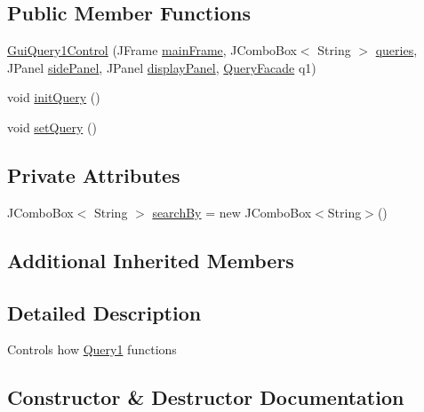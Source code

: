 \subsection*{Public Member Functions}
\begin{DoxyCompactItemize}
\item 
\hyperlink{classGuiQuery1Control_ac6989198b8ec672bd3d5329c98f0fe0a}{Gui\+Query1\+Control} (J\+Frame \hyperlink{classGUIQuery_aba988b5bec899d53480a472de7b87dfa}{main\+Frame}, J\+Combo\+Box$<$ String $>$ \hyperlink{classGUIQuery_a0db8bd960b4512cadf9aa40642934680}{queries}, J\+Panel \hyperlink{classGUIQuery_a70e233b1f14874166b7707edebe825d2}{side\+Panel}, J\+Panel \hyperlink{classGUIQuery_a8b4dbf257e0859c597591f072349b75c}{display\+Panel}, \hyperlink{classQueryFacade}{Query\+Facade} q1)
\item 
void \hyperlink{classGuiQuery1Control_a9d83b448fb4105b5a2c4c4902a7a1d49}{init\+Query} ()
\item 
void \hyperlink{classGuiQuery1Control_a7cf6dca14e3622abc057feff8c28260e}{set\+Query} ()
\end{DoxyCompactItemize}
\subsection*{Private Attributes}
\begin{DoxyCompactItemize}
\item 
J\+Combo\+Box$<$ String $>$ \hyperlink{classGuiQuery1Control_aff1971237254429cafcc0c76a1937793}{search\+By} = new J\+Combo\+Box$<$String$>$()
\end{DoxyCompactItemize}
\subsection*{Additional Inherited Members}


\subsection{Detailed Description}
Controls how \hyperlink{classQuery1}{Query1} functions 

\subsection{Constructor \& Destructor Documentation}
